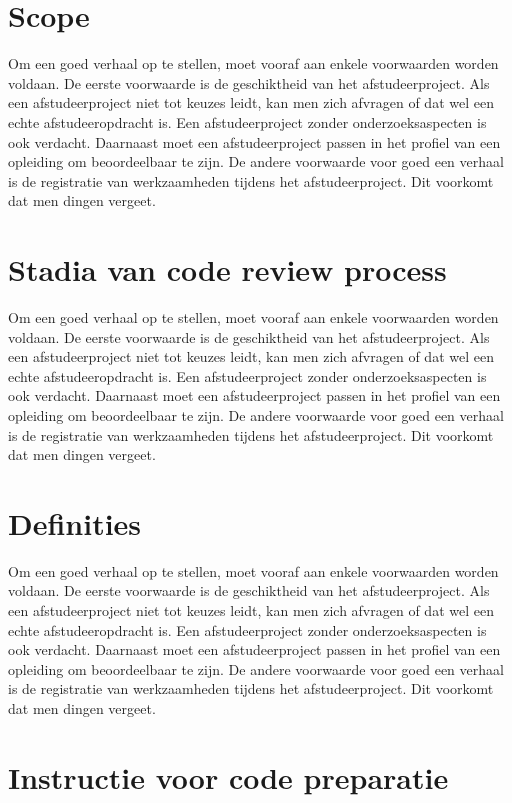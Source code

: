 			\section{Scope}
			
			Om een goed verhaal op te stellen, moet vooraf aan enkele voorwaarden
			worden voldaan. De eerste voorwaarde is de geschiktheid van het
			afstudeerproject. Als een afstudeerproject niet tot keuzes leidt, kan
			men zich afvragen of dat wel een echte afstudeeropdracht is. Een
			afstudeerproject zonder onderzoeksaspecten is ook verdacht. Daarnaast
			moet een afstudeerproject passen in het profiel van een opleiding om
			beoordeelbaar te zijn. De andere voorwaarde voor goed een verhaal is
			de registratie van werkzaamheden tijdens het afstudeerproject. Dit
			voorkomt dat men dingen vergeet.
			\section{Stadia van code review process}
			
			Om een goed verhaal op te stellen, moet vooraf aan enkele voorwaarden
			worden voldaan. De eerste voorwaarde is de geschiktheid van het
			afstudeerproject. Als een afstudeerproject niet tot keuzes leidt, kan
			men zich afvragen of dat wel een echte afstudeeropdracht is. Een
			afstudeerproject zonder onderzoeksaspecten is ook verdacht. Daarnaast
			moet een afstudeerproject passen in het profiel van een opleiding om
			beoordeelbaar te zijn. De andere voorwaarde voor goed een verhaal is
			de registratie van werkzaamheden tijdens het afstudeerproject. Dit
			voorkomt dat men dingen vergeet.
			\section{Definities}
			
			Om een goed verhaal op te stellen, moet vooraf aan enkele voorwaarden
			worden voldaan. De eerste voorwaarde is de geschiktheid van het
			afstudeerproject. Als een afstudeerproject niet tot keuzes leidt, kan
			men zich afvragen of dat wel een echte afstudeeropdracht is. Een
			afstudeerproject zonder onderzoeksaspecten is ook verdacht. Daarnaast
			moet een afstudeerproject passen in het profiel van een opleiding om
			beoordeelbaar te zijn. De andere voorwaarde voor goed een verhaal is
			de registratie van werkzaamheden tijdens het afstudeerproject. Dit
			voorkomt dat men dingen vergeet.
			\section{Instructie voor code preparatie}
			

